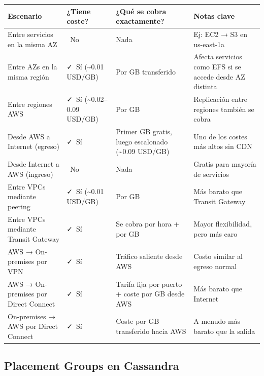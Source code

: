 \documentclass[12pt,a4paper]{report}
\newcommand{\vcheckmark}{\textcolor{successgreen}{\faCheck}}
\newcommand{\crossmark}{\textcolor{dangerred}{\faTimes}}
\begin{document}
\begin{center}
\begin{longtable}{|p{4cm}|p{2cm}|p{6cm}|p{3cm}|}
\hline
\cellcolor{awsblue!20}\textbf{Escenario} & \cellcolor{awsblue!20}\textbf{¿Tiene coste?} & \cellcolor{awsblue!20}\textbf{¿Qué se cobra exactamente?} & \cellcolor{awsblue!20}\textbf{Notas clave} \\
\hline
Entre servicios en la misma AZ & \crossmark\ No & Nada & Ej: EC2 → S3 en us-east-1a \\
\hline
Entre AZs en la misma región & \vcheckmark\ Sí (\textasciitilde 0.01 USD/GB) & Por GB transferido & Afecta servicios como EFS si se accede desde AZ distinta \\
\hline
Entre regiones AWS & \vcheckmark\ Sí (\textasciitilde 0.02–0.09 USD/GB) & Por GB & Replicación entre regiones también se cobra \\
\hline
Desde AWS a Internet (egreso) & \vcheckmark\ Sí & Primer GB gratis, luego escalonado (\textasciitilde 0.09 USD/GB) & Uno de los costes más altos sin CDN \\
\hline
Desde Internet a AWS (ingreso) & \crossmark\ No & Nada & Gratis para mayoría de servicios \\
\hline
Entre VPCs mediante peering & \vcheckmark\ Sí (\textasciitilde 0.01 USD/GB) & Por GB & Más barato que Transit Gateway \\
\hline
Entre VPCs mediante Transit Gateway & \vcheckmark\ Sí & Se cobra por hora + por GB & Mayor flexibilidad, pero más caro \\
\hline
AWS → On-premises por VPN & \vcheckmark\ Sí & Tráfico saliente desde AWS & Costo similar al egreso normal \\
\hline
AWS → On-premises por Direct Connect & \vcheckmark\ Sí & Tarifa fija por puerto + coste por GB desde AWS & Más barato que Internet \\
\hline
On-premises → AWS por Direct Connect & \vcheckmark\ Sí & Coste por GB transferido hacia AWS & A menudo más barato que la salida \\
\hline
\end{longtable}
\end{center}

\subsection{Placement Groups en Cassandra}
\end{document}
